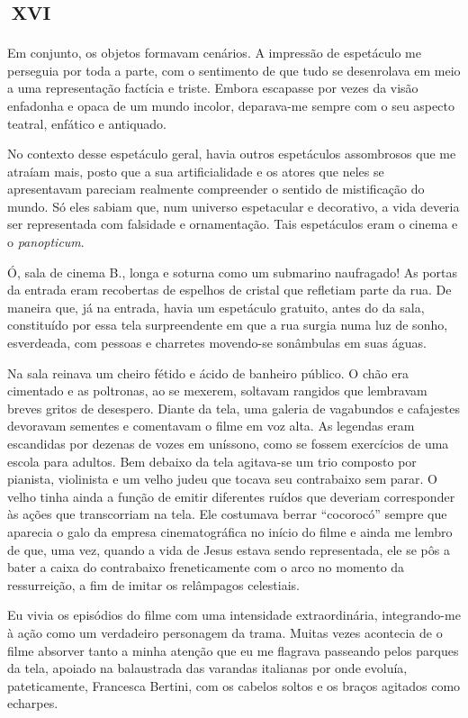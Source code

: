 \chapter*{\small{}\,\Large\centering\textsc{xvi}\,\small{}}

Em conjunto, os objetos formavam cenários. A impressão de espetáculo me perseguia por toda a parte, com o sentimento de que tudo se desenrolava em meio a uma representação factícia e triste. Embora escapasse por vezes da visão enfadonha e opaca de um mundo incolor, deparava-me sempre com o seu aspecto teatral, enfático e antiquado.

No contexto desse espetáculo geral, havia outros espetáculos assombrosos que me atraíam mais, posto que a sua artificialidade e os atores que neles se apresentavam pareciam realmente compreender o sentido de mistificação do mundo. Só eles sabiam que, num universo espetacular e decorativo, a vida deveria ser representada com falsidade e ornamentação. Tais espetáculos eram o cinema e o \textit{panopticum}. 

Ó, sala de cinema B., longa e soturna como um submarino naufragado! As portas da entrada eram recobertas de espelhos de cristal que refletiam parte da rua. De maneira que, já na entrada, havia um espetáculo gratuito, antes do da sala, constituído por essa tela surpreendente em que a rua surgia numa luz de sonho, esverdeada, com pessoas e charretes movendo-se sonâmbulas em suas águas.

Na sala reinava um cheiro fétido e ácido de banheiro público. O chão era cimentado e as poltronas, ao se mexerem, soltavam rangidos que lembravam breves gritos de desespero. Diante da tela, uma galeria de vagabundos e cafajestes devoravam sementes e comentavam o filme em voz alta. As legendas eram escandidas por dezenas de vozes em uníssono, como se fossem exercícios de uma escola para adultos. Bem debaixo da tela agitava-se um trio composto por pianista, violinista e um velho judeu que tocava seu contrabaixo sem parar. O velho tinha ainda a função de emitir diferentes ruídos que deveriam corresponder às ações que transcorriam na tela. Ele costumava berrar ``cocorocó'' sempre que aparecia o galo da empresa cinematográfica no início do filme e ainda me lembro de que, uma vez, quando a vida de Jesus estava sendo representada, ele se pôs a bater a caixa do contrabaixo freneticamente com o arco no momento da ressurreição, a fim de imitar os relâmpagos celestiais.

Eu vivia os episódios do filme com uma intensidade extraordinária, integrando-me à ação como um verdadeiro personagem da trama. Muitas vezes acontecia de o filme absorver tanto a minha atenção que eu me flagrava passeando pelos parques da tela, apoiado na balaustrada das varandas italianas por onde evoluía, pateticamente, Francesca Bertini,  com os cabelos soltos e os braços agitados como echarpes.

